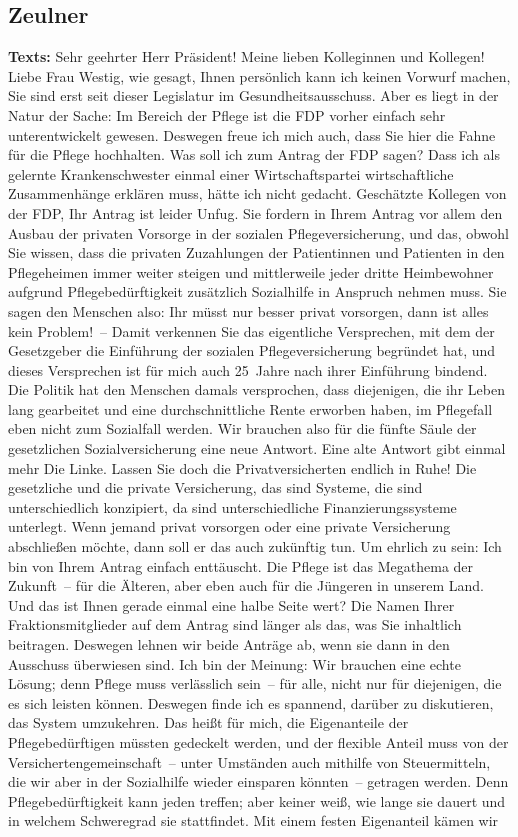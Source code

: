 \documentclass{article}
\begin{document}
\subsection{Zeulner}
\noindent\textbf{Texts:} Sehr geehrter Herr Präsident! Meine lieben Kolleginnen und Kollegen! Liebe Frau Westig, wie gesagt, Ihnen persönlich kann ich keinen Vorwurf machen, Sie sind erst seit dieser Legislatur im Gesundheitsausschuss. Aber es liegt in der Natur der Sache: Im Bereich der Pflege ist die FDP vorher einfach sehr unterentwickelt gewesen. Deswegen freue ich mich auch, dass Sie hier die Fahne für die Pflege hochhalten.  Was soll ich zum Antrag der FDP sagen? Dass ich als gelernte Krankenschwester einmal einer Wirtschaftspartei wirtschaftliche Zusammenhänge erklären muss, hätte ich nicht gedacht. Geschätzte Kollegen von der FDP, Ihr Antrag ist leider Unfug. Sie fordern in Ihrem Antrag vor allem den Ausbau der privaten Vorsorge in der sozialen Pflegeversicherung, und das, obwohl Sie wissen, dass die privaten Zuzahlungen der Patientinnen und Patienten in den Pflegeheimen immer weiter steigen  und mittlerweile jeder dritte Heimbewohner aufgrund Pflegebedürftigkeit zusätzlich Sozialhilfe in Anspruch nehmen muss. Sie sagen den Menschen also: Ihr müsst nur besser privat vorsorgen, dann ist alles kein Problem! – Damit verkennen Sie das eigentliche Versprechen, mit dem der Gesetzgeber die Einführung der sozialen Pflegeversicherung begründet hat, und dieses Versprechen ist für mich auch 25 Jahre nach ihrer Einführung bindend. Die Politik hat den Menschen damals versprochen, dass diejenigen, die ihr Leben lang gearbeitet und eine durchschnittliche Rente erworben haben, im Pflegefall eben nicht zum Sozialfall werden. Wir brauchen also für die fünfte Säule der gesetzlichen Sozialversicherung eine neue Antwort. Eine alte Antwort gibt einmal mehr Die Linke. Lassen Sie doch die Privatversicherten endlich in Ruhe! Die gesetzliche und die private Versicherung, das sind Systeme, die sind unterschiedlich konzipiert, da sind unterschiedliche Finanzierungssysteme unterlegt. Wenn jemand privat vorsorgen oder eine private Versicherung abschließen möchte, dann soll er das auch zukünftig tun. Um ehrlich zu sein: Ich bin von Ihrem Antrag einfach enttäuscht. Die Pflege ist das Megathema der Zukunft – für die Älteren, aber eben auch für die Jüngeren in unserem Land. Und das ist Ihnen gerade einmal eine halbe Seite wert? Die Namen Ihrer Fraktionsmitglieder auf dem Antrag sind länger als das, was Sie inhaltlich beitragen.  Deswegen lehnen wir beide Anträge ab, wenn sie dann in den Ausschuss überwiesen sind. Ich bin der Meinung: Wir brauchen eine echte Lösung; denn Pflege muss verlässlich sein – für alle, nicht nur für diejenigen, die es sich leisten können.  Deswegen finde ich es spannend, darüber zu diskutieren, das System umzukehren. Das heißt für mich, die Eigenanteile der Pflegebedürftigen müssten gedeckelt werden, und der flexible Anteil muss von der Versichertengemeinschaft – unter Umständen auch mithilfe von Steuermitteln, die wir aber in der Sozialhilfe wieder einsparen könnten – getragen werden. Denn Pflegebedürftigkeit kann jeden treffen; aber keiner weiß, wie lange sie dauert und in welchem Schweregrad sie stattfindet. Mit einem festen Eigenanteil kämen wir 
\end{document}
